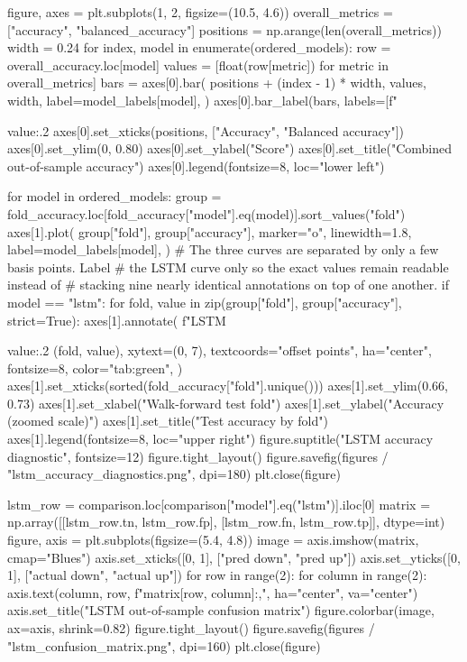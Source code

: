 \documentclass[UTF8,a4paper,fontset=fandol]{ctexart}
\begin{document}
\begin{ProjectCode}
    figure, axes = plt.subplots(1, 2, figsize=(10.5, 4.6))
    overall_metrics = ["accuracy", "balanced_accuracy"]
    positions = np.arange(len(overall_metrics))
    width = 0.24
    for index, model in enumerate(ordered_models):
        row = overall_accuracy.loc[model]
        values = [float(row[metric]) for metric in overall_metrics]
        bars = axes[0].bar(
            positions + (index - 1) * width,
            values,
            width,
            label=model_labels[model],
        )
        axes[0].bar_label(bars, labels=[f"{value:.2%
    axes[0].set_xticks(positions, ["Accuracy", "Balanced accuracy"])
    axes[0].set_ylim(0, 0.80)
    axes[0].set_ylabel("Score")
    axes[0].set_title("Combined out-of-sample accuracy")
    axes[0].legend(fontsize=8, loc="lower left")

    for model in ordered_models:
        group = fold_accuracy.loc[fold_accuracy["model"].eq(model)].sort_values("fold")
        axes[1].plot(
            group["fold"],
            group["accuracy"],
            marker="o",
            linewidth=1.8,
            label=model_labels[model],
        )
        # The three curves are separated by only a few basis points.  Label
        # the LSTM curve only so the exact values remain readable instead of
        # stacking nine nearly identical annotations on top of one another.
        if model == "lstm":
            for fold, value in zip(group["fold"], group["accuracy"], strict=True):
                axes[1].annotate(
                    f"LSTM {value:.2%
                    (fold, value),
                    xytext=(0, 7),
                    textcoords="offset points",
                    ha="center",
                    fontsize=8,
                    color="tab:green",
                )
    axes[1].set_xticks(sorted(fold_accuracy["fold"].unique()))
    axes[1].set_ylim(0.66, 0.73)
    axes[1].set_xlabel("Walk-forward test fold")
    axes[1].set_ylabel("Accuracy (zoomed scale)")
    axes[1].set_title("Test accuracy by fold")
    axes[1].legend(fontsize=8, loc="upper right")
    figure.suptitle("LSTM accuracy diagnostic", fontsize=12)
    figure.tight_layout()
    figure.savefig(figures / "lstm_accuracy_diagnostics.png", dpi=180)
    plt.close(figure)

    lstm_row = comparison.loc[comparison["model"].eq("lstm")].iloc[0]
    matrix = np.array([[lstm_row.tn, lstm_row.fp], [lstm_row.fn, lstm_row.tp]], dtype=int)
    figure, axis = plt.subplots(figsize=(5.4, 4.8))
    image = axis.imshow(matrix, cmap="Blues")
    axis.set_xticks([0, 1], ["pred down", "pred up"])
    axis.set_yticks([0, 1], ["actual down", "actual up"])
    for row in range(2):
        for column in range(2):
            axis.text(column, row, f"{matrix[row, column]:,}", ha="center", va="center")
    axis.set_title("LSTM out-of-sample confusion matrix")
    figure.colorbar(image, ax=axis, shrink=0.82)
    figure.tight_layout()
    figure.savefig(figures / "lstm_confusion_matrix.png", dpi=160)
    plt.close(figure)

}}
\end{ProjectCode}
\end{document}
